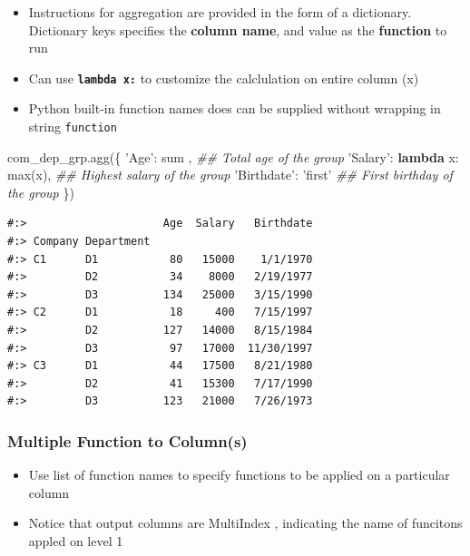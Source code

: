 \documentclass[
]{book}
\newenvironment{Shaded}{\begin{snugshade}}{\end{snugshade}}
\newcommand{\BuiltInTok}[1]{#1}
\newcommand{\CommentTok}[1]{\textcolor[rgb]{0.37,0.37,0.37}{\textit{#1}}}
\newcommand{\KeywordTok}[1]{\textcolor[rgb]{0.27,0.27,0.27}{\textbf{#1}}}
\newcommand{\NormalTok}[1]{#1}
\newcommand{\StringTok}[1]{\textcolor[rgb]{0.5,0.5,0.5}{#1}}
\providecommand{\tightlist}{%
  \setlength{\itemsep}{0pt}\setlength{\parskip}{0pt}}
\begin{document}
\begin{itemize}
\tightlist
\item
  Instructions for aggregation are provided in the form of a dictionary. Dictionary keys specifies the \textbf{column name}, and value as the \textbf{function} to run\\
\item
  Can use \textbf{\texttt{lambda\ x:}} to customize the calclulation on entire column (x)\\
\item
  Python built-in function names does can be supplied without wrapping in string \texttt{\textquotesingle{}function\textquotesingle{}}
\end{itemize}

\begin{Shaded}
\begin{Highlighting}[]
\NormalTok{com_dep_grp.agg(\{}
  \StringTok{'Age'}\NormalTok{: }\BuiltInTok{sum}\NormalTok{ ,                 }\CommentTok{## Total age of the group}
  \StringTok{'Salary'}\NormalTok{: }\KeywordTok{lambda}\NormalTok{ x: }\BuiltInTok{max}\NormalTok{(x),  }\CommentTok{## Highest salary of the group}
  \StringTok{'Birthdate'}\NormalTok{: }\StringTok{'first'}         \CommentTok{## First birthday of the group}
\NormalTok{\})}
\end{Highlighting}
\end{Shaded}

\begin{verbatim}
#:>                     Age  Salary   Birthdate
#:> Company Department                         
#:> C1      D1           80   15000    1/1/1970
#:>         D2           34    8000   2/19/1977
#:>         D3          134   25000   3/15/1990
#:> C2      D1           18     400   7/15/1997
#:>         D2          127   14000   8/15/1984
#:>         D3           97   17000  11/30/1997
#:> C3      D1           44   17500   8/21/1980
#:>         D2           41   15300   7/17/1990
#:>         D3          123   21000   7/26/1973
\end{verbatim}

\hypertarget{multiple-function-to-columns}{%
\subsubsection{Multiple Function to Column(s)}\label{multiple-function-to-columns}}

\begin{itemize}
\tightlist
\item
  Use list of function names to specify functions to be applied on a particular column\\
\item
  Notice that output columns are MultiIndex , indicating the name of funcitons appled on level 1
\end{itemize}
\end{document}
